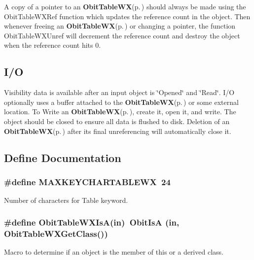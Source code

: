 A copy of a pointer to an {\bf Obit\-Table\-WX}{\rm (p.\,\pageref{structObitTableWX})} should always be made using the Obit\-Table\-WXRef function which updates the reference count in the object. Then whenever freeing an {\bf Obit\-Table\-WX}{\rm (p.\,\pageref{structObitTableWX})} or changing a pointer, the function Obit\-Table\-WXUnref will decrement the reference count and destroy the object when the reference count hits 0.\subsection{I/O}\label{ObitTableWX_8h_ObitTableWXUsage}
Visibility data is available after an input object is \char`\"{}Opened\char`\"{} and \char`\"{}Read\char`\"{}. I/O optionally uses a buffer attached to the {\bf Obit\-Table\-WX}{\rm (p.\,\pageref{structObitTableWX})} or some external location. To Write an {\bf Obit\-Table\-WX}{\rm (p.\,\pageref{structObitTableWX})}, create it, open it, and write. The object should be closed to ensure all data is flushed to disk. Deletion of an {\bf Obit\-Table\-WX}{\rm (p.\,\pageref{structObitTableWX})} after its final unreferencing will automatically close it.

\subsection{Define Documentation}
\subsubsection{\setlength{\rightskip}{0pt plus 5cm}\#define MAXKEYCHARTABLEWX\ 24}\label{ObitTableWX_8h_a0}


Number of characters for Table keyword. 

\subsubsection{\setlength{\rightskip}{0pt plus 5cm}\#define Obit\-Table\-WXIs\-A(in)\ Obit\-Is\-A (in, Obit\-Table\-WXGet\-Class())}\label{ObitTableWX_8h_a3}


Macro to determine if an object is the member of this or a derived class. 

